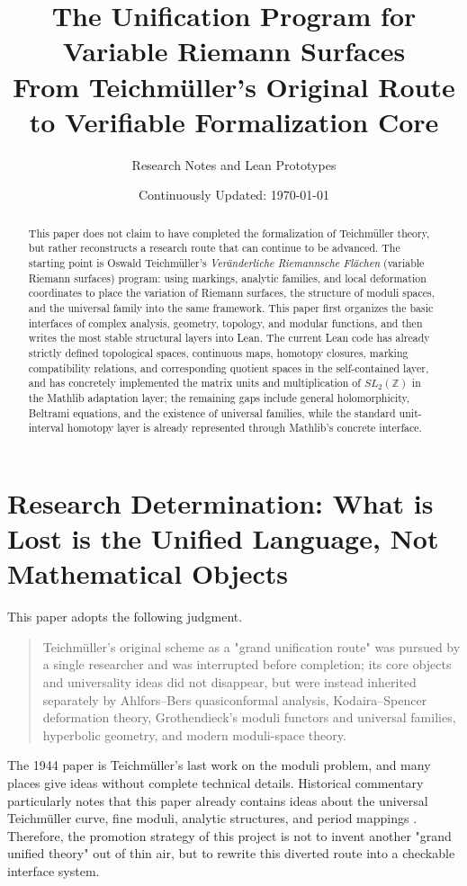 \documentclass[UTF8,a4paper,11pt]{article}
\title{\textbf{The Unification Program for Variable Riemann Surfaces}\texorpdfstring{\\}{:}From Teichmüller's Original Route to Verifiable Formalization Core}
\author{Research Notes and Lean Prototypes}
\date{Continuously Updated: \today}
\begin{document}
\maketitle

\begin{abstract}
This paper does not claim to have completed the formalization of Teichmüller theory, but rather reconstructs a research route that can continue to be advanced. The starting point is Oswald Teichmüller's
\emph{Veränderliche Riemannsche Flächen} (variable Riemann surfaces) program: using markings, analytic families, and local deformation coordinates to place the variation of Riemann surfaces, the structure of moduli spaces, and the universal family into the same framework. This paper first organizes the basic interfaces of complex analysis, geometry, topology, and modular functions, and then writes the most stable structural layers into Lean. The current Lean code has already strictly defined topological spaces, continuous maps, homotopy closures, marking compatibility relations, and corresponding quotient spaces in the self-contained layer, and has concretely implemented the matrix units and multiplication of $SL_2(\mathbb Z)$ in the Mathlib adaptation layer; the remaining gaps include general holomorphicity, Beltrami equations, and the existence of universal families, while the standard unit-interval homotopy layer is already represented through Mathlib's concrete interface.
\end{abstract}

\tableofcontents

\section{Research Determination: What is Lost is the Unified Language, Not Mathematical Objects}

This paper adopts the following judgment.

\begin{quote}
Teichmüller's original scheme as a "grand unification route" was pursued by a single researcher and was interrupted before completion; its core objects and universality ideas did not disappear, but were instead inherited separately by Ahlfors--Bers quasiconformal analysis, Kodaira--Spencer deformation theory, Grothendieck's moduli functors and universal families, hyperbolic geometry, and modern moduli-space theory.
\end{quote}

The 1944 paper is Teichmüller's last work on the moduli problem, and many places give ideas without complete technical details. Historical commentary particularly notes that this paper already contains ideas about the universal Teichmüller curve, fine moduli, analytic structures, and period mappings \cite{ACampo2012,ACampo2016}. Therefore, the promotion strategy of this project is not to invent another "grand unified theory" out of thin air, but to rewrite this diverted route into a checkable interface system.
\end{document}
